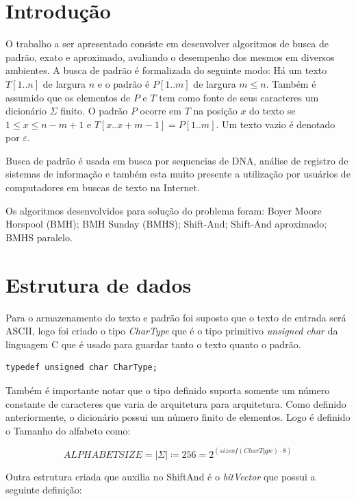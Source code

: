 \documentclass[11pt]{article}
\begin{document}
\newcommand{\myDistance}{2.8cm}
\section{Introdução}
\label{sec:orgaac6447}

O trabalho a ser apresentado consiste em desenvolver algoritmos de busca de padrão, exato e aproximado, avaliando o desempenho dos mesmos em diversos ambientes. A busca de padrão é formalizada do seguinte modo: Há um texto \(T[1..n]\) de largura \(n\) e o padrão é \(P[1..m]\) de largura \(m\leq n\). Também é assumido que os elementos de \(P\) e \(T\) tem como fonte de seus caracteres um dicionário \(\Sigma\) finito. O padrão \(P\) ocorre em \(T\) na posição \(x\) do texto se \(1\leq x \leq n-m+1\) e \(T[x..x+m-1]=P[1..m]\). Um texto vazio é denotado por \(\varepsilon\). \cite{cormen09_introd}

Busca de padrão é usada em busca por sequencias de DNA, análise de registro de sistemas de informação e também esta muito presente a utilização por usuários de computadores em buscas de texto na Internet.

Os algoritmos desenvolvidos para solução do problema foram: Boyer Moore Horspool (BMH); BMH Sunday (BMHS); Shift-And; Shift-And aproximado; BMHS paralelo.

\section{Estrutura de dados}
\label{sec:org74d5200}
Para o armazenamento do texto e padrão foi suposto que o texto de entrada será ASCII, logo foi criado o tipo \emph{CharType} que é o tipo primitivo \emph{unsigned char} da linguagem C que é usado para guardar tanto o texto quanto o padrão.
\begin{verbatim}
typedef unsigned char CharType;
\end{verbatim}

Também é importante notar que o tipo definido suporta somente um número constante de caracteres que varia de arquitetura para arquitetura. Como definido anteriormente, o dicionário possui um número finito de elementos.
Logo é definido o Tamanho do alfabeto como:

\begin{equation}
ALPHABETSIZE = |\Sigma| \coloneqq 256 = 2^{(sizeof(CharType)\cdot 8)}
\end{equation}

Outra estrutura criada que auxilia no ShiftAnd é o \emph{bitVector} que possui a seguinte definição: \cite{bitarrayclibrary}
\end{document}
